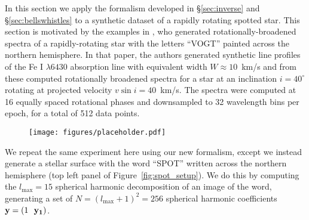 \documentclass[modern]{aastex62}
\begin{document}
In this section we apply the formalism developed in \S\ref{sec:inverse}
and \S\ref{sec:bellswhistles} to a synthetic dataset of a rapidly
rotating spotted star. This section is motivated by the
examples in \cite{Vogt1987}, who generated rotationally-broadened spectra
of a rapidly-rotating star with the letters ``VOGT'' painted across
the northern hemisphere. In that paper, the authors
generated synthetic line profiles of the Fe I
$\lambda 6430$ absorption line with equivalent width $W \approx 10$~km/s
and from these computed rotationally broadened spectra for a star at an
inclination $i=40^\circ$ rotating at projected velocity $v\sin i = 40$~km/s.
The spectra were computed at 16 equally spaced rotational phases and
downsampled to 32 wavelength bins per epoch, for a total of 512 data
points.

\begin{figure}[t!]
    \begin{centering}
        \texttt{[image: figures/placeholder.pdf]} %
    \end{centering}
\end{figure}

We repeat the same experiment here using our new formalism, except we
instead generate a stellar surface with the word ``SPOT'' written across
the northern hemisphere (top left panel of Figure~\ref{fig:spot_setup}).
We do this by computing the $l_\mathrm{max} = 15$ spherical harmonic
decomposition of an image of the word, generating a set of
$N = (l_\mathrm{max} + 1)^2 = 256$ spherical harmonic coefficients
$\bvec{y} = (1 \quadquad \bvec{y_1})$.
\end{document}
